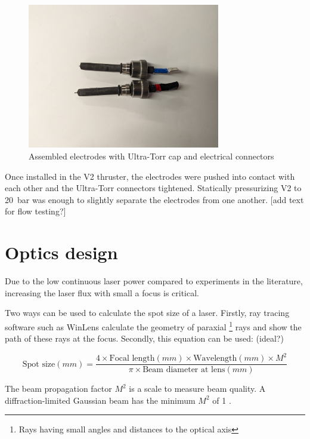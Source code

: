                 \begin{figure}[h]
                    \centering
                    \includegraphics[width=0.75\textwidth]{assets/3 design/V2 electrodes.jpg}
                    \caption{Assembled electrodes with Ultra-Torr cap and electrical connectors}
                    \label{fig:Assembled electrode}
                \end{figure}

                Once installed in the V2 thruster, the electrodes were pushed into contact with each other and the Ultra-Torr connectors tightened. Statically pressurizing V2 to \qty{20}{bar} was enough to slightly separate the electrodes from one another. [add text for flow testing?]
    
    \section{Optics design}
                
                Due to the low continuous laser power compared to experiments in the literature, increasing the laser flux with small a focus is critical.

                Two ways can be used to calculate the spot size of a laser. Firstly, ray tracing software such as WinLens calculate the geometry of paraxial \footnote{Rays having small angles and distances to the optical axis} rays and show the path of these rays at the focus. Secondly, this equation \cite{LaserSpotSize} can be used: (ideal?)
                
                \[
                \text{Spot size}(mm) = \frac{4 \times \text{Focal length}(mm) \times \text{Wavelength}(mm) \times M^2}{\pi \times \text{Beam diameter at lens}(mm)}
                \]

                The beam propagation factor $M^2$ is a scale to measure beam quality. A diffraction-limited Gaussian beam has the minimum $M^2$ of 1 \cite{hechtUnderstandingLasersEntry2019}. 
                
